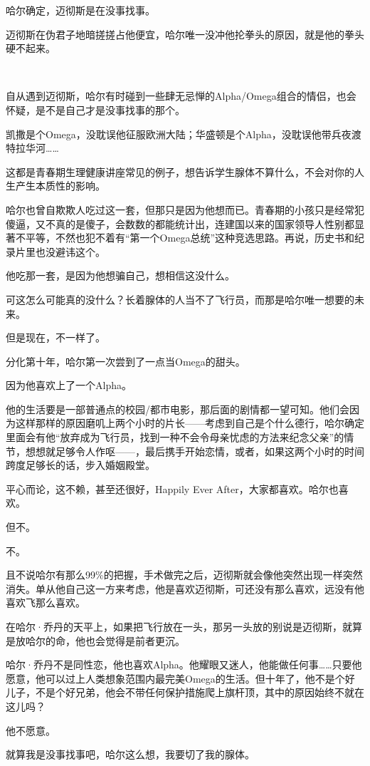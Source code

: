 \documentclass[../main]{subfiles}
\begin{document}
哈尔确定，迈彻斯是在没事找事。

迈彻斯在伪君子地暗搓搓占他便宜，哈尔唯一没冲他抡拳头的原因，就是他的拳头硬不起来。

~\

自从遇到迈彻斯，哈尔有时碰到一些肆无忌惮的Alpha/Omega组合的情侣，也会怀疑，是不是自己才是没事找事的那个。

凯撒是个Omega，没耽误他征服欧洲大陆；华盛顿是个Alpha，没耽误他带兵夜渡特拉华河……

这都是青春期生理健康讲座常见的例子，想告诉学生腺体不算什么，不会对你的人生产生本质性的影响。

哈尔也曾自欺欺人吃过这一套，但那只是因为他想而已。青春期的小孩只是经常犯傻逼，又不真的是傻子，会数数的都能统计出，连建国以来的国家领导人性别都显著不平等，不然也犯不着有“第一个Omega总统”这种竞选思路。再说，历史书和纪录片里也没避讳这个。

他吃那一套，是因为他想骗自己，想相信这没什么。

可这怎么可能真的没什么？长着腺体的人当不了飞行员，而那是哈尔唯一想要的未来。

但是现在，不一样了。

分化第十年，哈尔第一次尝到了一点当Omega的甜头。

因为他喜欢上了一个Alpha。

他的生活要是一部普通点的校园/都市电影，那后面的剧情都一望可知。他们会因为这样那样的原因磨叽上两个小时的片长——考虑到自己是个什么德行，哈尔确定里面会有他“放弃成为飞行员，找到一种不会令母亲忧虑的方法来纪念父亲”的情节，想想就足够令人作呕——，最后携手开始恋情，或者，如果这两个小时的时间跨度足够长的话，步入婚姻殿堂。

平心而论，这不赖，甚至还很好，Happily Ever
After，大家都喜欢。哈尔也喜欢。

但不。

不。

且不说哈尔有那么99\%的把握，手术做完之后，迈彻斯就会像他突然出现一样突然消失。单从他自己这一方来考虑，他是喜欢迈彻斯，可还没有那么喜欢，远没有他喜欢飞那么喜欢。

在哈尔·乔丹的天平上，如果把飞行放在一头，那另一头放的别说是迈彻斯，就算是放哈尔的命，他也会觉得是前者更沉。

哈尔·乔丹不是同性恋，他也喜欢Alpha。他耀眼又迷人，他能做任何事……只要他愿意，他可以过上人类想象范围内最完美Omega的生活。但十年了，他不是个好儿子，不是个好兄弟，他会不带任何保护措施爬上旗杆顶，其中的原因始终不就在这儿吗？

他不愿意。

就算我是没事找事吧，哈尔这么想，我要切了我的腺体。
\end{document}

